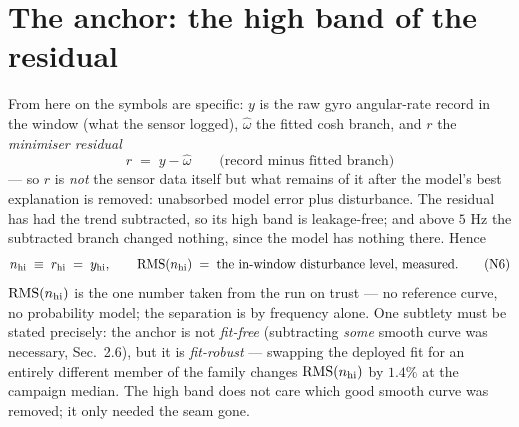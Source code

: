 \documentclass[10pt]{article}
\newcommand{\rms}{\mathrm{RMS}}
\begin{document}
\section{The anchor: the high band of the residual}

From here on the symbols are specific: $y$ is the raw gyro
angular-rate record in the window (what the sensor logged),
$\hat\omega$ the fitted cosh branch, and $r$ the \emph{minimiser
residual}
\begin{equation*}
  r \;=\; y - \hat\omega
  \qquad\text{(record minus fitted branch)}
\end{equation*}
--- so $r$ is \emph{not} the sensor data itself but what remains of
it after the model's best explanation is removed: unabsorbed model
error plus disturbance. The residual has had the trend subtracted, so
its high band is leakage-free; and above $5$ Hz the subtracted branch
changed nothing, since the model has nothing there. Hence
\begin{equation}
  n_{\rm hi} \;\equiv\; r_{\rm hi} \;=\; y_{\rm hi},
  \qquad \rms(n_{\rm hi}) \;=\; \text{the in-window disturbance
  level, measured}.
  \tag{N6}
\end{equation}
$\rms(n_{\rm hi})$ is the one number taken from the run on trust ---
no reference curve, no probability model; the separation is by
frequency alone. One subtlety must be stated precisely: the anchor is
not \emph{fit-free} (subtracting \emph{some} smooth curve was
necessary, Sec.~2.6), but it is \emph{fit-robust} --- swapping the
deployed fit for an entirely different member of the family changes
$\rms(n_{\rm hi})$ by $1.4\%$ at the campaign median. The high band
does not care which good smooth curve was removed; it only needed the
seam gone.
\end{document}

